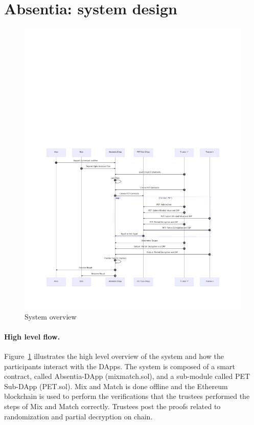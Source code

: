
\section{Absentia: system design}
\label{sec:system}

\begin{figure}[t]
	\includegraphics[width=1\textwidth]{figures/absentia.pdf}
	\caption{System overview}
	\centering
	\label{fig:system}
\end{figure}


\paragraph{High level flow.} 
Figure~\ref{fig:system} illustrates the high level overview of the system and how the participants interact with the DApps. The system is composed of a smart contract, called Absentia-DApp (mixmatch.sol), and a sub-module called PET Sub-DApp (PET.sol). Mix and Match is done offline and the Ethereum blockchain is used to perform the verifications that the trustees performed the steps of Mix and Match correctly. Trustees post the proofs related to randomization and partial decryption on chain.

